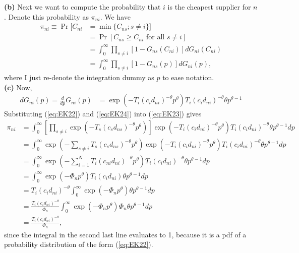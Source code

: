 \documentclass[12pt]{article}
\begin{document}
\textbf{(b)} Next we want to compute the probability that $i$ is the cheapest supplier for $n$. Denote this probability as $\pi_{ni}$. We have
\begin{align}
\pi_{ni} \equiv \Pr[ C_{ni} &= \min\{C_{ns}; s\neq i\}] \nonumber \\
&= \Pr[C_{ns} \geq C_{ni} \text{ for all } s \neq i]\nonumber \\ 
&= \int_0^\infty \prod_{s\neq i}[1-G_{ns}(C_{ni})] dG_{ni}(C_{ni})\nonumber \\
&=  \int_0^\infty \prod_{s\neq i}[1-G_{ns}(p)] dG_{ni}(p), \label{eq:EK23}
\end{align}
where I just re-denote the integration dummy as $p$ to ease notation.\\

\textbf{(c)} Now,
\begin{align}
dG_{ni}(p) = \frac{d}{dp} G_{ni}(p) &= \exp(-T_i(c_id_{ni})^{-\theta}p^\theta) T_i(c_id_{ni})^{-\theta} \theta p^{\theta-1} \label{eq:EK24}
\end{align}
Substituting (\ref{eq:EK22}) and (\ref{eq:EK24}) into (\ref{eq:EK23}) gives
\begin{align*}
\pi_{ni} &= \int_0^\infty\left[ \prod_{s\neq i} \exp(-T_s(c_sd_{ns})^{-\theta}p^\theta) \right] \exp(-T_i(c_id_{ni})^{-\theta}p^\theta) T_i(c_id_{ni})^{-\theta} \theta p^{\theta-1}dp\\
&=  \int_0^\infty\exp(-\sum_{s \neq i} T_s(c_sd_{ns})^{-\theta}p^\theta)  \exp(-T_i(c_id_{ni})^{-\theta}p^\theta) T_i(c_id_{ni})^{-\theta} \theta p^{\theta-1}dp\\
&= \int_0^\infty\exp(-\sum_{i=1}^N T_i(c_{ni}d_{ni})^{-\theta}p^\theta)T_i(c_id_{ni})^{-\theta} \theta p^{\theta-1}dp\\
&=\int_0^\infty\exp(-\Phi_np^\theta) T_i(c_id_{ni}) \theta p^{\theta-1}dp\\
&=T_i(c_id_{ni})^{-\theta} \int_0^\infty\exp(-\Phi_np^\theta) \theta p^{\theta-1}dp\\
&= \frac{T_i(c_id_{ni})^{-\theta} }{\Phi_n} \int_0^\infty\exp(-\Phi_np^\theta) \Phi_n\theta p^{\theta-1}dp\\
&=\frac{T_i(c_id_{ni})^{-\theta} }{\Phi_n},
\end{align*}
since the integral in the second last line evaluates to 1, because it is a pdf of a probability distribution of the form (\ref{eq:EK22}).
\end{document}

